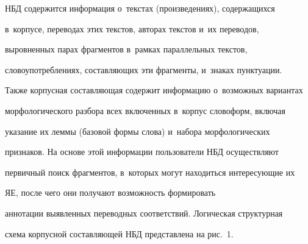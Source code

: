 НБД содержится информация о~текс\-тах (произведениях), содержащихся 


в~корпусе, переводах этих текс\-тов, авторах текс\-тов и~их переводов, 


выровненных парах фрагментов в~рамках параллельных текс\-тов, 


словоупотреблениях, со\-став\-ля\-ющих эти фрагменты, и~знаках пунктуации. 


Также корпусная со\-став\-ля\-ющая содержит информацию о~возможных вариантах 


морфологического разбора всех включенных в~корпус словоформ, вклю\-чая 


указание их леммы (базовой формы слова) и~набора морфологических 


признаков. На основе этой информации пользователи НБД осуществляют 


первичный поиск фраг\-мен\-тов, в~которых могут находиться ин\-те\-ре\-су\-ющие их 


ЯЕ, после чего они получают воз\-мож\-ность формировать 


аннотации вы\-яв\-лен\-ных переводных соответствий. Логическая структурная 


схема корпусной со\-став\-ля\-ющей НБД пред\-став\-ле\-на на рис.~1.


   











  \smallskip


  







\hangindent=5mm





